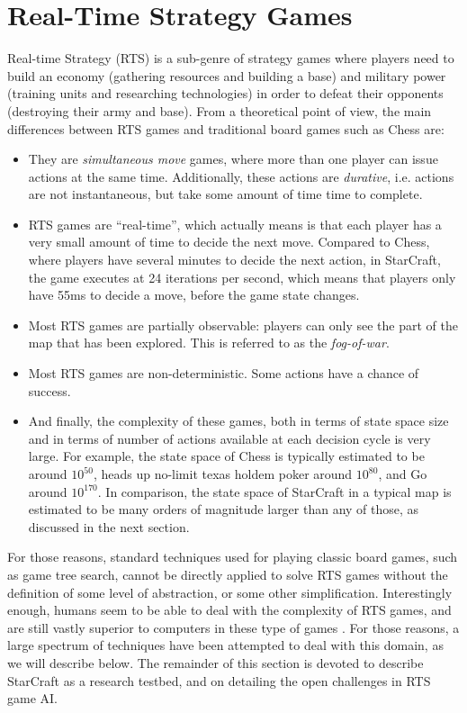 \documentclass[journal]{IEEEtran}
\begin{document}

\section{Real-Time Strategy Games}\label{sec:rts}

Real-time Strategy (RTS) is a sub-genre of strategy games where players need to build an economy (gathering resources and building a base) and military power (training units and researching technologies) in order to defeat their opponents (destroying their army and base). From a theoretical point of view, the main differences between RTS games and traditional board games such as Chess are:

\begin{itemize}
\item They are {\em simultaneous move} games, where more than one player can issue actions at the same time. Additionally, these actions are {\em durative}, i.e. actions are not instantaneous, but take some amount of time time to complete.
\item RTS games are ``real-time'', which actually means is that each player has a very small amount of time to decide the next move. Compared to Chess, where players have several minutes to decide the next action, in StarCraft, the game executes at 24 iterations per second, which means that players only have 55ms to decide a move, before the game state changes.
\item Most RTS games are partially observable: players can only see the part of the map that has been explored. This is referred to as the {\em fog-of-war}.
\item Most RTS games are non-deterministic. Some actions have a chance of success.
\item And finally, the complexity of these games, both in terms of state space size and in terms of number of actions available at each decision cycle is very large. For example, the state space of Chess is typically estimated to be around $10^{50}$, heads up no-limit texas holdem poker around $10^{80}$, and Go around $10^{170}$. In comparison, the state space of StarCraft in a typical map is estimated to be many orders of magnitude larger than any of those, as discussed in the next section.
\end{itemize}

For those reasons, standard techniques used for playing classic board games, such as game tree search, cannot be directly applied to solve RTS games without the definition of some level of abstraction, or some other simplification. Interestingly enough, humans seem to be able to deal with the complexity of RTS games, and are still vastly superior to computers in these type of games \cite{burochurchill2012aimagazine}. For those reasons, a large spectrum of techniques have been attempted to deal with this domain, as we will describe below. The remainder of this section is devoted to describe StarCraft as a research testbed, and on detailing the open challenges in RTS game AI.
\end{document}
